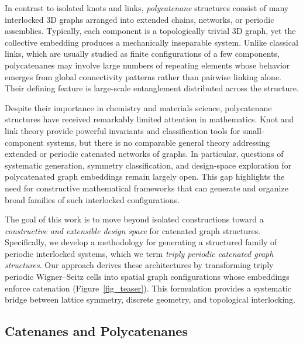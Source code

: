 \documentclass[times,twocolumn,final]{elsarticle}
\begin{document}
In contrast to isolated knots and links, \emph{polycatenane} structures consist of many interlocked 3D graphs arranged into extended chains, networks, or periodic assemblies. Typically, each component is a topologically trivial 3D graph, yet the collective embedding produces a mechanically inseparable system. Unlike classical links, which are usually studied as finite configurations of a few components, polycatenanes may involve large numbers of repeating elements whose behavior emerges from global connectivity patterns rather than pairwise linking alone. Their defining feature is large-scale entanglement distributed across the structure.

Despite their importance in chemistry and materials science, polycatenane structures have received remarkably limited attention in mathematics. Knot and link theory provide powerful invariants and classification tools for small-component systems, but there is no comparable general theory addressing extended or periodic catenated networks of graphs. In particular, questions of systematic generation, symmetry classification, and design-space exploration for polycatenated graph embeddings remain largely open. This gap highlights the need for constructive mathematical frameworks that can generate and organize broad families of such interlocked configurations.

The goal of this work is to move beyond isolated constructions toward a \emph{constructive and extensible design space} for catenated graph structures. Specifically, we develop a methodology for generating a structured family of periodic interlocked systems, which we term \emph{triply periodic catenated graph structures}. Our approach derives these architectures by transforming triply periodic Wigner–Seitz cells into spatial graph configurations whose embeddings enforce catenation (Figure~\ref{fig_teaser}). This formulation provides a systematic bridge between lattice symmetry, discrete geometry, and topological interlocking.

\subsection{Catenanes and Polycatenanes}

\end{document}
